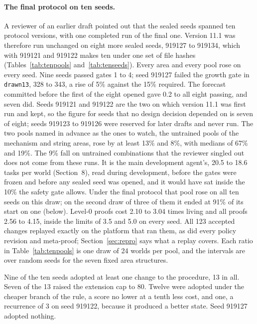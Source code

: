 \documentclass[11pt]{article}
\begin{document}
\paragraph{The final protocol on ten seeds.} A reviewer of an earlier draft pointed out that the sealed seeds spanned ten protocol versions, with one completed run of the final one. Version 11.1 was therefore run unchanged on eight more sealed seeds, 919127 to 919134, which with 919121 and 919122 makes ten under one set of file hashes (Tables~\ref{tab:tenpools} and~\ref{tab:tenseeds}). Every area and every pool rose on every seed. Nine seeds passed gates 1 to 4; seed 919127 failed the growth gate in \texttt{drawn13}, 328 to 343, a rise of 5\% against the 15\% required. The forecast committed before the first of the eight opened gave 0.2 to all eight passing, and seven did. Seeds 919121 and 919122 are the two on which version 11.1 was first run and kept, so the figure for seeds that no design decision depended on is seven of eight; seeds 919123 to 919126 were reserved for later drafts and never run. The two pools named in advance as the ones to watch, the untrained pools of the mechanism and string areas, rose by at least 13\% and 8\%, with medians of 67\% and 19\%. The 9\% fall on untrained combinations that the reviewer singled out does not come from these runs. It is the main development agent's, 20.5 to 18.6 tasks per world (Section~8), read during development, before the gates were frozen and before any sealed seed was opened, and it would have sat inside the 10\% the safety gate allows. Under the final protocol that pool rose on all ten seeds on this draw; on the second draw of three of them it ended at 91\% of its start on one (below). Level-0 proofs cost 2.10 to 3.04 times living and all proofs 2.56 to 4.15, inside the limits of 3.5 and 5.0 on every seed. All 123 accepted changes replayed exactly on the platform that ran them, as did every policy revision and meta-proof; Section~\ref{sec:repro} says what a replay covers. Each ratio in Table~\ref{tab:tenpools} is one draw of 24 worlds per pool, and the intervals are over random seeds for the seven fixed area structures.

Nine of the ten seeds adopted at least one change to the procedure, 13 in all. Seven of the 13 raised the extension cap to 80. Twelve were adopted under the cheaper branch of the rule, a score no lower at a tenth less cost, and one, a recurrence of 3 on seed 919122, because it produced a better state. Seed 919127 adopted nothing.
\end{document}
